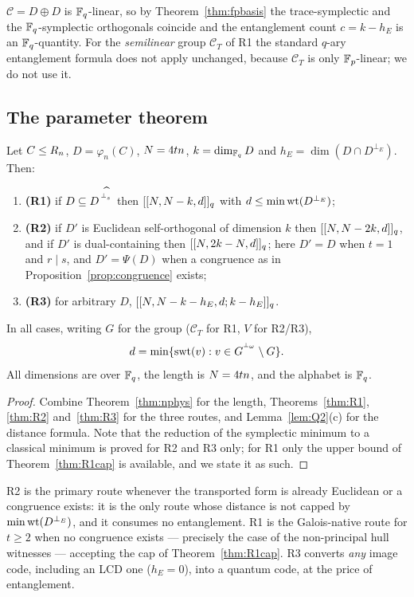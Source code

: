 \begin{remark}
$\mathcal C=D\oplus D$ is $\mathbb F_q$-linear, so by
Theorem~\ref{thm:fpbasis} the trace-symplectic and the $\mathbb F_q$-symplectic
orthogonals coincide and the entanglement count $c=k-h_E$ is an $\mathbb F_q$-quantity.
For the \emph{semilinear} group $\mathcal C_T$ of R1 the standard $q$-ary
entanglement formula does not apply unchanged, because $\mathcal C_T$ is only
$\mathbb F_p$-linear; we do not use it.
\end{remark}

\subsection{The parameter theorem}

\begin{theorem}[parameters]\label{thm:parameters}
Let $C\le R_n$, $D=\varphi_n(C)$, $N=4tn$, $k=\dim_{\mathbb F_q}D$ and
$h_E=\dim(D\cap D^{\perp_E})$. Then:
\begin{enumerate}[label=\textnormal{(\alph*)},leftmargin=*]
\item \textbf{(R1)} if $D\subseteq D^{\,{}^{\perp^{\widehat{}}_s}}$ then $[[N,N-k,d]]_q$
  with $d\le\min\operatorname{wt}(D^{\perp_E})$;
\item \textbf{(R2)} if $D'$ is Euclidean self-orthogonal of dimension $k$ then
  $[[N,N-2k,d]]_q$, and if $D'$ is dual-containing then
  $[[N,2k-N,d]]_q$; here $D'=D$ when $t=1$ and $r\mid s$, and
  $D'=\Psi(D)$ when a congruence as in Proposition~\ref{prop:congruence}
  exists;
\item \textbf{(R3)} for arbitrary $D$,
  $[[N,N-k-h_E,d;k-h_E]]_q$.
\end{enumerate}
In all cases, writing $G$ for the group ($\mathcal C_T$ for R1, $V$ for R2/R3),
\[
  d=\min\{\operatorname{swt}(v):v\in G^{{}^{\perp_\omega}}\setminus G\}.
\]
All dimensions are over $\mathbb F_q$, the length is $N=4tn$, and the alphabet is
$\mathbb F_q$.
\end{theorem}

\begin{proof}
Combine Theorem~\ref{thm:nphys} for the length, Theorems~\ref{thm:R1},
\ref{thm:R2} and~\ref{thm:R3} for the three routes, and
Lemma~\ref{lem:Q2}(c) for the distance formula. Note that the reduction of the
symplectic minimum to a classical minimum is proved for R2 and R3 only; for R1
only the upper bound of Theorem~\ref{thm:R1cap} is available, and we state it as
such.
\end{proof}

\begin{remark}
R2 is the primary route whenever the transported form is already Euclidean or a
congruence exists: it is the only route whose distance is not capped by
$\min\operatorname{wt}(D^{\perp_E})$, and it consumes no entanglement. R1 is the
Galois-native route for $t\ge2$ when no congruence exists --- precisely the case
of the non-principal hull witnesses --- accepting the cap of
Theorem~\ref{thm:R1cap}. R3 converts \emph{any} image code, including an LCD one
($h_E=0$), into a quantum code, at the price of entanglement.
\end{remark}


